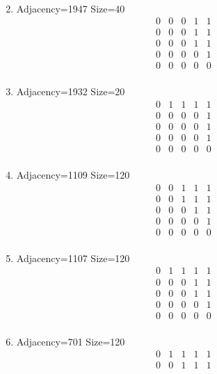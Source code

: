 \documentclass[12pt]{article}
\begin{document}
\begin{multicols}{3}
\begin{enumerate}
\begin{equation*}
\begin{array}{ccccc}
\end{array}
\end{equation*}
\item Adjacency=1947 Size=40
\begin{equation*}
\begin{array}{ccccc}
0&0&0&1&1\\
0&0&0&1&1\\
0&0&0&1&1\\
0&0&0&0&1\\
0&0&0&0&0\\
\end{array}
\end{equation*}
\item Adjacency=1932 Size=20
\begin{equation*}
\begin{array}{ccccc}
0&1&1&1&1\\
0&0&0&0&1\\
0&0&0&0&1\\
0&0&0&0&1\\
0&0&0&0&0\\
\end{array}
\end{equation*}
\item Adjacency=1109 Size=120
\begin{equation*}
\begin{array}{ccccc}
0&0&1&1&1\\
0&0&1&1&1\\
0&0&0&1&1\\
0&0&0&0&1\\
0&0&0&0&0\\
\end{array}
\end{equation*}
\item Adjacency=1107 Size=120
\begin{equation*}
\begin{array}{ccccc}
0&1&1&1&1\\
0&0&0&1&1\\
0&0&0&1&1\\
0&0&0&0&1\\
0&0&0&0&0\\
\end{array}
\end{equation*}
\item Adjacency=701 Size=120
\begin{equation*}
\begin{array}{ccccc}
0&1&1&1&1\\
0&0&1&1&1\\

\end{array}
\end{equation*}
\end{enumerate}
\end{multicols}
\end{document}
